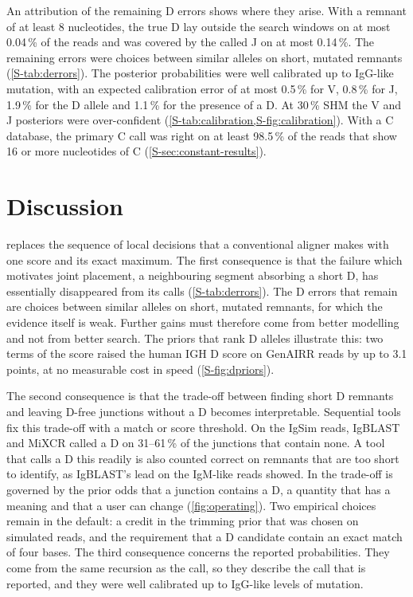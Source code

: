 \documentclass[11pt,a4paper]{article}
\begin{document}
An attribution of the remaining D errors shows where they arise. With a
remnant of at least 8 nucleotides, the true D lay outside the search windows
on at most 0.04\,\% of the reads and was covered by the called J on at most
0.14\,\%. The remaining errors were choices between similar alleles on
short, mutated remnants (\cref{S-tab:derrors}). The posterior probabilities
were well calibrated up to IgG-like mutation, with an expected calibration
error of at most 0.5\,\% for V, 0.8\,\% for J, 1.9\,\% for the D allele and
1.1\,\% for the presence of a D. At 30\,\% SHM the V and J posteriors were
over-confident (\cref{S-tab:calibration,S-fig:calibration}). With a C database, the primary
C call was right on at least 98.5\,\% of the reads that show 16 or more
nucleotides of C (\cref{S-sec:constant-results}).

\FloatBarrier
\section{Discussion}
\label{sec:discussion}

\swig{} replaces the sequence of local decisions that a conventional aligner
makes with one score and its exact maximum. The first consequence is that
the failure which motivates joint placement, a neighbouring segment
absorbing a short D, has essentially disappeared from its calls
(\cref{S-tab:derrors}). The D errors that remain are choices between similar
alleles on short, mutated remnants, for which the evidence itself is weak.
Further gains must therefore come from better modelling and not from better
search. The priors that rank D alleles illustrate this: two terms of the
score raised the human IGH D score on GenAIRR reads by up to 3.1 points, at
no measurable cost in speed (\cref{S-fig:dpriors}).

The second consequence is that the trade-off between finding short D
remnants and leaving D-free junctions without a D becomes interpretable.
Sequential tools fix this trade-off with a match or score threshold. On the
IgSim reads, IgBLAST and MiXCR called a D on 31--61\,\% of the junctions
that contain none. A tool that calls a D this readily is also counted
correct on remnants that are too short to identify, as IgBLAST's lead on the
IgM-like reads showed. In \swig{} the trade-off is governed by the prior
odds that a junction contains a D, a quantity that has a meaning and that a
user can change (\cref{fig:operating}). Two empirical choices remain in the
default: a credit in the trimming prior that was chosen on simulated reads,
and the requirement that a D candidate contain an exact match of four bases.
The third consequence concerns the reported probabilities. They come from
the same recursion as the call, so they describe the call that is reported,
and they were well calibrated up to IgG-like levels of mutation.
\end{document}
